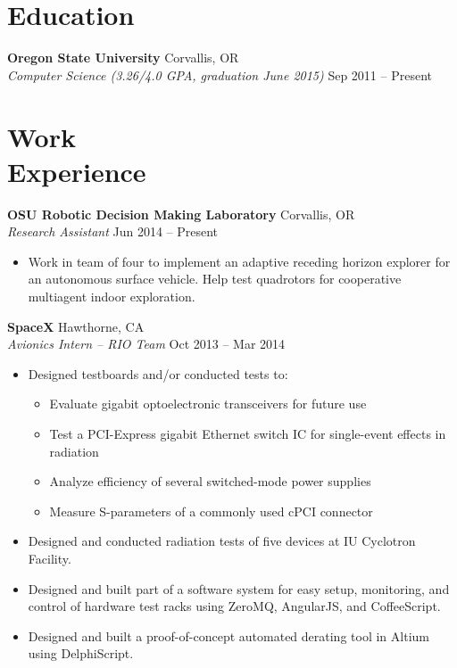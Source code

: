 \documentclass[10pt,letterpaper,margin]{res}
\begin{document}
\begin{resume}

\section{Education}

{\bf Oregon State University} \hfill {\color{lightgray} Corvallis, OR} \\
{\it Computer Science (3.26/4.0 GPA, graduation June 2015)} \hfill {\color{lightgray} Sep 2011 -- Present}\vspace{0.0em}


\section{Work \\ Experience}

{\bf OSU Robotic Decision Making Laboratory} \hfill {\color{lightgray} Corvallis, OR} \\
{\it Research Assistant} \hfill {\color{lightgray} Jun 2014 -- Present}\vspace{0.0em}

\begin{itemize}
	\item Work in team of four to implement an adaptive receding horizon
		explorer for an autonomous surface vehicle. Help test quadrotors for
		cooperative multiagent indoor exploration.
\end{itemize}


{\bf SpaceX} \hfill {\color{lightgray} Hawthorne, CA} \\
{\it Avionics Intern -- RIO Team} \hfill {\color{lightgray} Oct 2013 -- Mar 2014}\vspace{0.0em}

\begin{itemize}
	\item Designed testboards and/or conducted tests to:
		\begin{itemize}
			\item Evaluate gigabit optoelectronic transceivers for future use
			\item Test a PCI-Express gigabit Ethernet switch IC for
				single-event effects in radiation
			\item Analyze efficiency of several switched-mode power supplies
			\item Measure S-parameters of a commonly used cPCI connector
		\end{itemize}
	\item Designed and conducted radiation tests of five devices at IU
		Cyclotron Facility.
	\item Designed and built part of a software system for easy setup,
		monitoring, and control of hardware test racks using ZeroMQ, AngularJS,
		and CoffeeScript.
	\item Designed and built a proof-of-concept automated derating tool in
		Altium using DelphiScript.
\end{itemize}



\end{resume}
\end{document}
